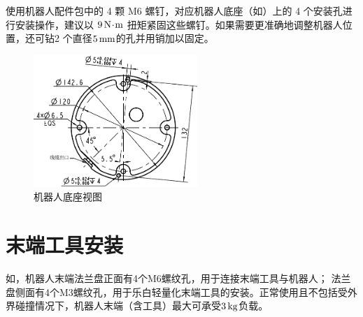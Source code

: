 

使用机器人配件包中的 4 颗 M6 螺钉，对应机器人底座（如）上的 4 个安装孔进行安装操作，建议以 $9\,\mathrm{N\!\cdot\! m}$ 扭矩紧固这些螺钉。如果需要更准确地调整机器人位置，还可钻2 个直径$5 \,\mathrm{mm}$的孔并用销加以固定。


\begin{figure}[htb!]
    \centering
    \includegraphics[height=5cm]{line_graphs/bottom_surface.pdf}
    \caption{机器人底座视图}
    \label{fig:机器人底座视图}
\end{figure}



\clearpage

\section{末端工具安装}

如，机器人末端法兰盘正面有4个M6螺纹孔，用于连接末端工具与机器人；
法兰盘侧面有4个M3螺纹孔，用于乐白轻量化末端工具的安装。正常使用且不包括受外界碰撞情况下，机器人末端（含工具）最大可承受$3\,\mathrm{kg}$负载。


